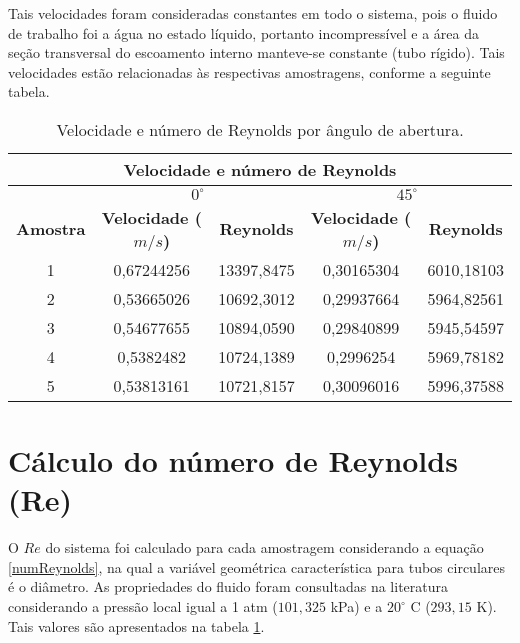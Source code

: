 Tais velocidades foram consideradas constantes em todo o sistema, pois o fluido
de trabalho foi a água no estado líquido, portanto incompressível e a área da
seção transversal do escoamento interno manteve-se constante (tubo rígido). Tais
velocidades estão relacionadas às respectivas amostragens, conforme a seguinte
tabela.

\begin{table}[H]
\centering
\caption{Velocidade e número de Reynolds por ângulo de abertura.}
\label{t:Reynolds}
\begin{tabular}{|c|c|c|c|c|}
\hline
\multicolumn{5}{|c|}{\textbf{Velocidade e  número de Reynolds}}                                                      \\ \hline
\textbf{}        & \multicolumn{2}{c|}{\textbf{$0^\circ$}}         & \multicolumn{2}{c|}{\textbf{$45^\circ$}}        \\ \hline
\textbf{Amostra} & \textbf{Velocidade ($m/s$)} & \textbf{Reynolds} & \textbf{Velocidade ($m/s$)} & \textbf{Reynolds} \\ \hline
1                & 0,67244256                  & 13397,8475        & 0,30165304                  & 6010,18103        \\ \hline
2                & 0,53665026                  & 10692,3012        & 0,29937664                  & 5964,82561        \\ \hline
3                & 0,54677655                  & 10894,0590        & 0,29840899                  & 5945,54597        \\ \hline
4                & 0,5382482                   & 10724,1389        & 0,2996254                   & 5969,78182        \\ \hline
5                & 0,53813161                  & 10721,8157        & 0,30096016                  & 5996,37588        \\ \hline
\end{tabular}
\end{table}

\section{Cálculo do número de Reynolds (Re)}
\label{sec:Reynolds}

O $Re$ do sistema foi calculado para cada amostragem considerando a equação
\eqref{numReynolds}, na qual a variável geométrica característica para tubos
circulares é o diâmetro. As propriedades do fluido foram consultadas na
literatura considerando a pressão local igual a 1 atm ($101,325$ kPa) e a
$20^\circ$ C ($293,15$ K). Tais valores são apresentados na tabela
\ref{t:Reynolds}.

